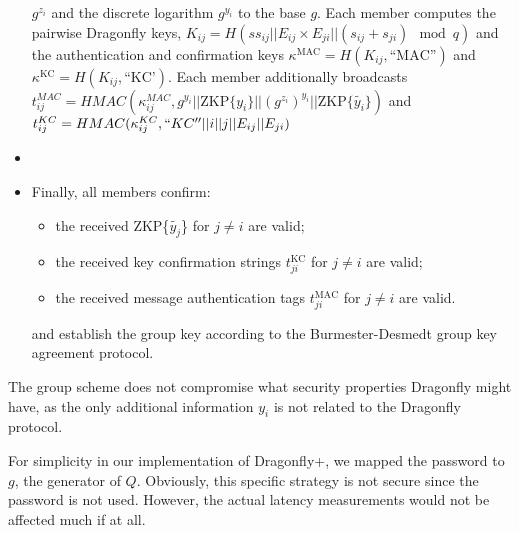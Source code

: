\begin{itemize}
        $g^{z_i}$ and the discrete logarithm $g^{y_i}$ to the base $g$. Each member computes the pairwise Dragonfly keys,
        $K_{ij} = H(ss_{ij} || E_{ij} \times E_{ji} || (s_{ij} + s_{ji}) \mod q)$ and the authentication and confirmation keys
        $\kappa^{\text{MAC}} = H(K_{ij}, \text{``MAC''})$ and $\kappa^{\text{KC}} = H(K_{ij}, \text{``KC'})$. Each member additionally
        broadcasts $t_{ij}^{MAC} = HMAC(\kappa_{ij}^{MAC},  g^{y_i} || \text{ZKP}\{y_i\} || (g^{z_i})^{y_i} || \text{ZKP}\{\tilde{y_i}\})$ and
        $t_{ij}^{KC} = HMAC(\kappa_{ij}^{KC}, ``KC'' || i || j || E_{ij} || E_{ji})$
    \item[]
    \item[] Finally, all members confirm:
        \begin{itemize}
            \item the received ZKP\{$\tilde{y_j}$\} for $j \neq i$ are valid;
            \item the received key confirmation strings $t^{\text{KC}}_{ji}$ for $j \neq i$ are valid;
            \item the received message authentication tags $t^{\text{MAC}}_{ji}$ for $j \neq i$ are valid.
        \end{itemize}
        and establish the group key according to the Burmester-Desmedt group key agreement protocol.
\end{itemize}

The group scheme does not compromise what security properties Dragonfly might have, as the only additional information $y_i$ is not
related to the Dragonfly protocol.

For simplicity in our implementation of Dragonfly+, we mapped the password to $g$, the generator of $Q$. Obviously, this specific strategy is not
secure since the password is not used. However, the actual latency measurements would not be affected much if at all.

